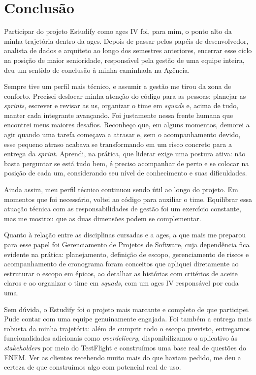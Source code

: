\section[Conclusão]{Conclusão}

Participar do projeto Estudify como \ac{ages} IV foi, para mim, o ponto alto da minha trajetória dentro da \ac{ages}. Depois de passar pelos papéis de desenvolvedor, analista de dados e arquiteto ao longo dos semestres anteriores, encerrar esse ciclo na posição de maior senioridade, responsável pela gestão de uma equipe inteira, deu um sentido de conclusão à minha caminhada na Agência.

Sempre tive um perfil mais técnico, e assumir a gestão me tirou da zona de conforto. Precisei deslocar minha atenção do código para as pessoas: planejar as \textit{sprints}, escrever e revisar as \ac{us}, organizar o time em \textit{squads} e, acima de tudo, manter cada integrante avançando. Foi justamente nessa frente humana que encontrei meus maiores desafios. Reconheço que, em alguns momentos, demorei a agir quando uma tarefa começava a atrasar e, sem o acompanhamento devido, esse pequeno atraso acabava se transformando em um risco concreto para a entrega da \textit{sprint}. Aprendi, na prática, que liderar exige uma postura ativa: não basta perguntar se está tudo bem, é preciso acompanhar de perto e se colocar na posição de cada um, considerando seu nível de conhecimento e suas dificuldades.

Ainda assim, meu perfil técnico continuou sendo útil ao longo do projeto. Em momentos que foi necessário, voltei ao código para auxiliar o time. Equilibrar essa atuação técnica com as responsabilidades de gestão foi um exercício constante, mas me mostrou que as duas dimensões podem se complementar.

Quanto à relação entre as disciplinas cursadas e a \ac{ages}, a que mais me preparou para esse papel foi Gerenciamento de Projetos de Software, cuja dependência fica evidente na prática: planejamento, definição de escopo, gerenciamento de riscos e acompanhamento de cronograma foram conceitos que apliquei diretamente ao estruturar o escopo em épicos, ao detalhar as histórias com critérios de aceite claros e ao organizar o time em \textit{squads}, com um \ac{ages} IV responsável por cada uma.

Sem dúvida, o Estudify foi o projeto mais marcante e completo de que participei. Pude contar com uma equipe genuinamente engajada. Foi também a entrega mais robusta da minha trajetória: além de cumprir todo o escopo previsto, entregamos funcionalidades adicionais como \textit{overdelivery}, disponibilizamos o aplicativo às \textit{stakeholders} por meio do TestFlight e construímos uma base real de questões do ENEM. Ver as clientes recebendo muito mais do que haviam pedido, me deu a certeza de que construímos algo com potencial real de uso.

